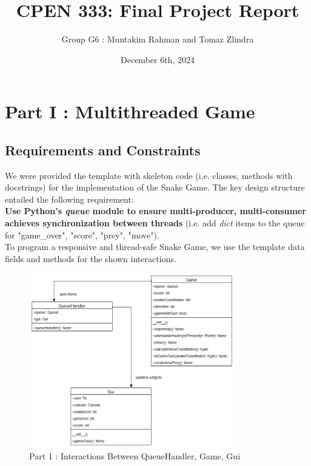 \documentclass{article}
\title{CPEN 333: Final Project Report}
\author{Group G6 : Muntakim Rahman and Tomaz Zlindra}
\date{December 6th, 2024}
\begin{document}
\maketitle

\section{Part I : Multithreaded Game}

\subsection{Requirements and Constraints}

We were provided the template with skeleton code (i.e. classes, methods with docstrings) for the implementation of the Snake Game.
The key design structure entailed the following requirement: \\

\textbf{Use Python's \textit{queue} module to ensure multi-producer, multi-consumer achieves synchronization between threads} (i.e. add \textit{dict} items to the queue for "game\_over", "score", "prey", "move"). \\

To program a responsive and thread-safe Snake Game, we use the template data fields and methods for the shown interactions.

\begin{figure}[H]
    \centering
     \includegraphics[width=0.8\textwidth]{Part_1_ClassDiagram.jpg}
     \caption{Part 1 : Interactions Between QueueHandler, Game, Gui}
     \label{fig:PreyCapture}
 \end{figure}
\end{document}
